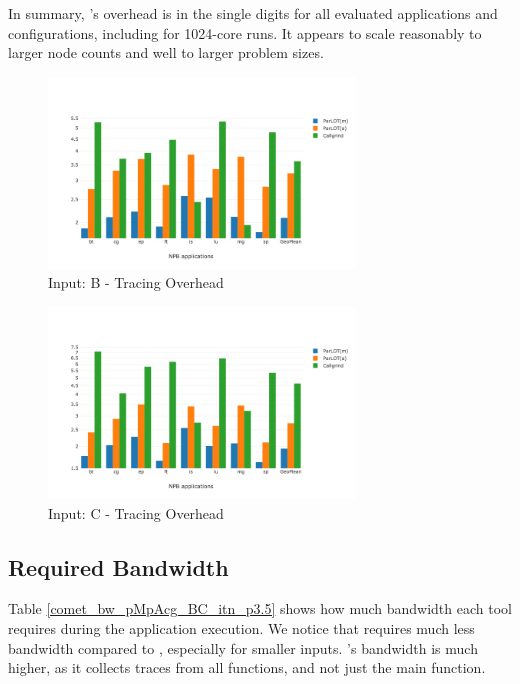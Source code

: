 In summary, \parlot 's overhead is in the single digits for all evaluated applications and configurations, including for 1024-core runs. It appears to scale reasonably to larger node counts and well to larger problem sizes.



\begin{figure}[t]
\centering
\includegraphics[width=3.2in]{figs.comet.newMed/comet_chartAvg_sd_B_p3_5.png}
\caption{ Input: B - Tracing Overhead
}
\label{comet_chartAvg_sd_B_p3_5}
\end{figure}


\begin{figure}[t]
\centering
\includegraphics[width=3.2in]{figs.comet.newMed/comet_chartAvg_sd_C_p3_5.png}
\caption{ Input: C - Tracing Overhead}
\label{comet_chartAvg_sd_C_p3_5}
\end{figure}






  
\subsection{Required Bandwidth}
\label{subsec:lowbw}



Table \ref{comet_bw_pMpAcg_BC_itn_p3.5} shows how much bandwidth each tool 
requires
during the application execution. 
%
We notice that \parlotm requires much less bandwidth compared to
\callgrind, especially for smaller inputs. 
%
\parlota's bandwidth is much higher, as it collects traces from all
functions, and not just the main function.



